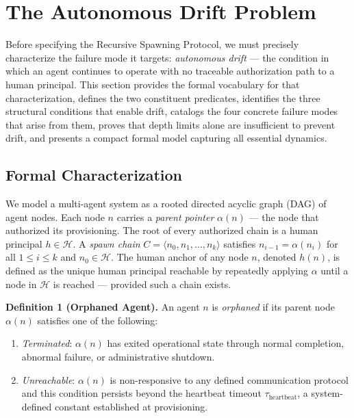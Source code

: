 \section{The Autonomous Drift Problem}
\label{sec:rs-drift}

Before specifying the Recursive Spawning Protocol, we must precisely characterize the failure mode it targets: \emph{autonomous drift} — the condition in which an agent continues to operate with no traceable authorization path to a human principal. This section provides the formal vocabulary for that characterization, defines the two constituent predicates, identifies the three structural conditions that enable drift, catalogs the four concrete failure modes that arise from them, proves that depth limits alone are insufficient to prevent drift, and presents a compact formal model capturing all essential dynamics.

\subsection{Formal Characterization}
\label{sec:rs-drift-formal}

We model a multi-agent system as a rooted directed acyclic graph (DAG) of agent nodes. Each node $n$ carries a \emph{parent pointer} $\alpha(n)$ — the node that authorized its provisioning. The root of every authorized chain is a human principal $h \in \mathcal{H}$. A \emph{spawn chain} $C = \langle n_0, n_1, \ldots, n_k \rangle$ satisfies $n_{i-1} = \alpha(n_i)$ for all $1 \leq i \leq k$ and $n_0 \in \mathcal{H}$. The human anchor of any node $n$, denoted $h(n)$, is defined as the unique human principal reachable by repeatedly applying $\alpha$ until a node in $\mathcal{H}$ is reached — provided such a chain exists.

\medskip
\noindent\textbf{Definition 1 (Orphaned Agent).}
An agent $n$ is \emph{orphaned} if its parent node $\alpha(n)$ satisfies one of the following:

\begin{enumerate}
  \item[(a)] \emph{Terminated}: $\alpha(n)$ has exited operational state through normal completion, abnormal failure, or administrative shutdown.
  \item[(b)] \emph{Unreachable}: $\alpha(n)$ is non-responsive to any defined communication protocol and this condition persists beyond the heartbeat timeout $\tau_{\mathrm{heartbeat}}$, a system-defined constant established at provisioning.
\end{enumerate}

